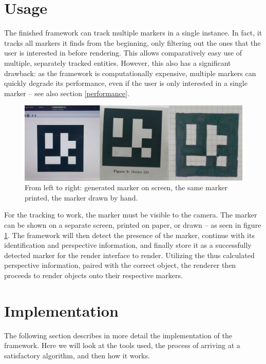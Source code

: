 \section{Usage}

The finished framework can track multiple markers in a single instance.
In fact, it tracks all markers it finds from the beginning, only filtering out the ones that the user is interested in before rendering.
This allows comparatively easy use of multiple, separately tracked entities.
However, this also has a significant drawback: as the framework is computationally expensive, multiple markers can quickly degrade its performance, even if the user is only interested in a single marker – see also section \ref{performance}.

\begin{figure}[H]
	\centering
	\includegraphics[width=12cm]{img/mult_marker.png}
	\caption[Usage Forms of Markers]{From left to right: generated marker on screen, the same marker printed, the marker drawn by hand.}
	\label{fig:mult_markers}
\end{figure}

For the tracking to work, the marker must be visible to the camera.
The marker can be shown on a separate screen, printed on paper, or drawn – as seen in figure \ref{fig:mult_markers}.
The framework will then detect the presence of the marker, continue with its identification and perspective information, and finally store it as a successfully detected marker for the render interface to render.
Utilizing the thus calculated perspective information, paired with the correct object, the renderer then proceeds to render objects onto their respective markers.

\section{Implementation}

The following section describes in more detail the implementation of the framework.
Here we will look at the tools used, the process of arriving at a satisfactory algorithm, and then how it works.

